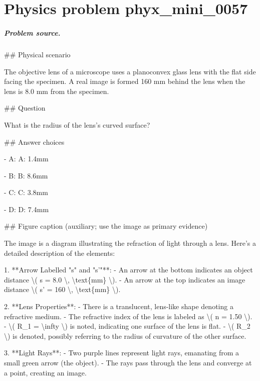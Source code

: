 
\chapter{Physics problem phyx\_mini\_0057}
\label{ch:PhyXMiniProblems_problem_phyx_mini_0057}

\paragraph{Problem source.}
\#\# Physical scenario

The objective lens of a microscope uses a planoconvex glass lens with the flat side facing the specimen. A real image is formed 160 mm behind the lens when the lens is 8.0 mm from the specimen.

\#\# Question

What is the radius of the lens’s curved surface?

\#\# Answer choices

- A: A: 1.4mm

- B: B: 8.6mm

- C: C: 3.8mm

- D: D: 7.4mm

\#\# Figure caption (auxiliary; use the image as primary evidence)

The image is a diagram illustrating the refraction of light through a lens. Here's a detailed description of the elements:

1. **Arrow Labelled "s" and "s'"**: 
   - An arrow at the bottom indicates an object distance \textbackslash{}( s = 8.0 \textbackslash{}, \textbackslash{}text\{mm\} \textbackslash{}).
   - An arrow at the top indicates an image distance \textbackslash{}( s' = 160 \textbackslash{}, \textbackslash{}text\{mm\} \textbackslash{}).

2. **Lens Properties**:
   - There is a translucent, lens-like shape denoting a refractive medium.
   - The refractive index of the lens is labeled as \textbackslash{}( n = 1.50 \textbackslash{}).
   - \textbackslash{}( R\_1 = \textbackslash{}infty \textbackslash{}) is noted, indicating one surface of the lens is flat.
   - \textbackslash{}( R\_2 \textbackslash{}) is denoted, possibly referring to the radius of curvature of the other surface.

3. **Light Rays**:
   - Two purple lines represent light rays, emanating from a small green arrow (the object).
   - The rays pass through the lens and converge at a point, creating an image.

